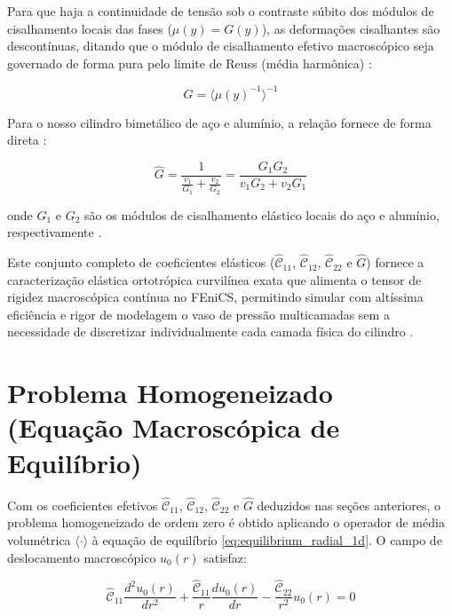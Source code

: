 Para que haja a continuidade de tensão sob o contraste súbito dos módulos de cisalhamento locais das fases ($\mu(y) = G(y)$), as deformações cisalhantes são descontínuas, ditando que o módulo de cisalhamento efetivo macroscópico seja governado de forma pura pelo limite de Reuss (média harmônica) \cite{Backus1962}:

\begin{equation}
  \hat{G} = \langle \mu(y)^{-1} \rangle^{-1}
  \label{eq:Chatg_Calculation}
\end{equation}

Para o nosso cilindro bimetálico de aço e alumínio, a relação fornece de forma direta \cite{Sadd2009}:

\begin{equation}
  \hat{G} = \frac{1}{\frac{v_1}{G_1} + \frac{v_2}{G_2}} = \frac{G_1 G_2}{v_1 G_2 + v_2 G_1}
  \label{eq:G_bilaminado}
\end{equation}

onde $G_1$ e $G_2$ são os módulos de cisalhamento elástico locais do aço e alumínio, respectivamente \cite{Sadd2009}.

Este conjunto completo de coeficientes elásticos ($\hat{\mathcal{C}}_{11}$, $\hat{\mathcal{C}}_{12}$, $\hat{\mathcal{C}}_{22}$ e $\hat{G}$) fornece a caracterização elástica ortotrópica curvilínea exata que alimenta o tensor de rigidez macroscópica contínua no FEniCS, permitindo simular com altíssima eficiência e rigor de modelagem o vaso de pressão multicamadas sem a necessidade de discretizar individualmente cada camada física do cilindro \cite{logg2012automated}.


\section{Problema Homogeneizado (Equação Macroscópica de Equilíbrio)}

Com os coeficientes efetivos $\hat{\mathcal{C}}_{11}$, $\hat{\mathcal{C}}_{12}$, $\hat{\mathcal{C}}_{22}$ e $\hat{G}$ deduzidos nas seções anteriores, o problema homogeneizado de ordem zero é obtido aplicando o operador de média volumétrica $\langle \cdot \rangle$ à equação de equilíbrio \eqref{eq:equilibrium_radial_1d}. O campo de deslocamento macroscópico $u_0(r)$ satisfaz:

\begin{equation}
  \hat{\mathcal{C}}_{11} \frac{d^2 u_0(r)}{dr^2} + \frac{\hat{\mathcal{C}}_{11}}{r} \frac{du_0(r)}{dr} - \frac{\hat{\mathcal{C}}_{22}}{r^2} u_0(r) = 0
  \label{eq:homogenized_equilibrium}
\end{equation}

